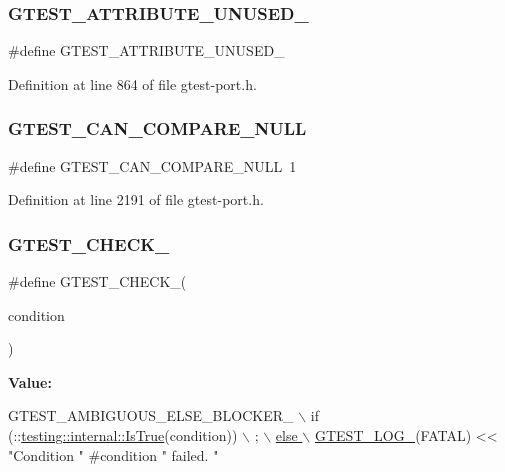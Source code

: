 \subsubsection{\texorpdfstring{G\+T\+E\+S\+T\+\_\+\+A\+T\+T\+R\+I\+B\+U\+T\+E\+\_\+\+U\+N\+U\+S\+E\+D\+\_\+}{GTEST\_ATTRIBUTE\_UNUSED\_}}
{\footnotesize\ttfamily \#define G\+T\+E\+S\+T\+\_\+\+A\+T\+T\+R\+I\+B\+U\+T\+E\+\_\+\+U\+N\+U\+S\+E\+D\+\_\+}



Definition at line 864 of file gtest-\/port.\+h.

\mbox{\label{gtest-port_8h_ab8b3af84a03ff5a6d833c109f44c9db4}} 
\subsubsection{\texorpdfstring{G\+T\+E\+S\+T\+\_\+\+C\+A\+N\+\_\+\+C\+O\+M\+P\+A\+R\+E\+\_\+\+N\+U\+LL}{GTEST\_CAN\_COMPARE\_NULL}}
{\footnotesize\ttfamily \#define G\+T\+E\+S\+T\+\_\+\+C\+A\+N\+\_\+\+C\+O\+M\+P\+A\+R\+E\+\_\+\+N\+U\+LL~1}



Definition at line 2191 of file gtest-\/port.\+h.

\mbox{\label{gtest-port_8h_ab54343f0a36dc4cb0ce8a478dd7847b8}} 
\subsubsection{\texorpdfstring{G\+T\+E\+S\+T\+\_\+\+C\+H\+E\+C\+K\+\_\+}{GTEST\_CHECK\_}}
{\footnotesize\ttfamily \#define G\+T\+E\+S\+T\+\_\+\+C\+H\+E\+C\+K\+\_\+(\begin{DoxyParamCaption}\item[{}]{condition }\end{DoxyParamCaption})}

{\bfseries Value\+:}
\begin{DoxyCode}
GTEST\_AMBIGUOUS\_ELSE\_BLOCKER\_ \(\backslash\)
    if (::\hyperlink{namespacetesting_1_1internal_a527b9bcc13669b9a16400c8514266254}{testing::internal::IsTrue}(condition)) \(\backslash\)
      ; \hyperlink{gtest-port_8h_a8ef4cb4c465db8c15464aecc6d9510ef}{\(\backslash\)}
\hyperlink{gtest-port_8h_a8ef4cb4c465db8c15464aecc6d9510ef}{    else \(\backslash\)}
\hyperlink{gtest-port_8h_a8ef4cb4c465db8c15464aecc6d9510ef}{      GTEST\_LOG\_}(FATAL) << \textcolor{stringliteral}{"Condition "} #condition \textcolor{stringliteral}{" failed. "}
\end{DoxyCode}


